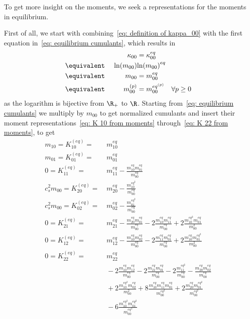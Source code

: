 
To get more insight on the moments, we seek a representations for the moments in equilibrium.

First of all, we start with combining~\eqref{eq: definition of kappa_00} with the first equation in~\eqref{eq: equilibrium cumulants}, which results in
\begin{alignat}{3}
  \nonumber
  &&\kappa_{00} &= \kappa_{00}^{eq} \\
  \nonumber
  &\equivalent&\ \ln(m_{00}) & {\ln(m_{00})}^{eq} \\
  \nonumber
  &\equivalent&\ m_{00} &= m_{00}^{eq} \\
  \label{eq: m 00 invariant}
  &\equivalent&\ m_{00}^{(p)} &= m_{00}^{eq^{(p)}} \quad\forall p\ge 0
\end{alignat}
as the logarithm is bijective from $\R_+$ to $\R$.
Starting from~\eqref{eq: equilibrium cumulants} we multiply by $m_{00}$ to get normalized cumulants and insert their moment representations~\eqref{eq: K 10 from moments} through~\eqref{eq: K 22 from moments}, to get
\begin{equation}
  \begin{aligned}
    m_{10} = K_{10}^{(eq)} = &\ m_{10}^{eq}
    \\
     m_{01} = K_{01}^{(eq)} = &\ m_{01}^{eq}
    \\
    0 = K_{11}^{(eq)} = &\ m_{11}^{eq} - \frac{m_{10}^{eq}m_{01}^{eq}}{m_{00}^{eq}}
    \\
    c_s^2 m_{00} = K_{20}^{(eq)} = &\ m_{20}^{eq} - \frac{m_{10}^{{eq}^2}}{m_{00}^{eq}}
    \\
    c_s^2 m_{00} = K_{02}^{(eq)} = &\ m_{02}^{eq} - \frac{m_{01}^{{eq}^2}}{m_{00}^{eq}}
    \\
    0 = K_{21}^{(eq)} = &\ m_{21}^{eq} - \frac{m_{20}^{eq}m_{01}^{eq}}{m_{00}^{eq}} - 2\frac{m_{10}^{eq}m_{11}^{eq}} {m_{00}^{eq}} + 2\frac{m_{10}^{{eq}^2} m_{01}^{eq}}{m_{00}^2}
    \\
    0 = K_{12}^{(eq)} = &\ m_{12}^{eq} - \frac{m_{10}^{eq}m_{02}^{eq}}{m_{00}^{eq}}
    - 2\frac{m_{11}^{eq}m_{01}^{eq}}{m_{00}^{eq}} + 2\frac{m_{10}^{eq} m_{01}^{{eq}^2}}{m_{00}^2}
    \\
    0 = K_{22}^{(eq)} = &\ m_{22}^{eq}
    \\&\
    - 2 \frac{m_{10}^{eq}m_{12}^{eq}}{m_{00}^{eq}} - 2\frac{m_{21}^{eq}m_{01}^{eq}}{m_{00}^{eq}}
    - 2 \frac{m_{11}^{{eq}^2}}{m_{00}^{eq}} - \frac{m_{20}^{eq}m_{02}^{eq}}{m_{00}^{eq}}
    \\&\
    + 2 \frac{m_{10}^{{eq}^2} m_{02}^{eq}}{m_{00}^2} + 8 \frac{m_{10}^{eq}m_{11}^{eq}m_{01}^{eq}} {m_{00}^{{eq}^2}}
    + 2 \frac{m_{20}^{eq}m_{01}^{{eq}^2}}{m_{00}^{{eq}^2}}
    \\&\
    - 6 \frac{m_{10}^{{eq}^2} m_{01}^{{eq}^2}}{m_{00}^{{eq}^3}}
  \end{aligned}
\end{equation}
